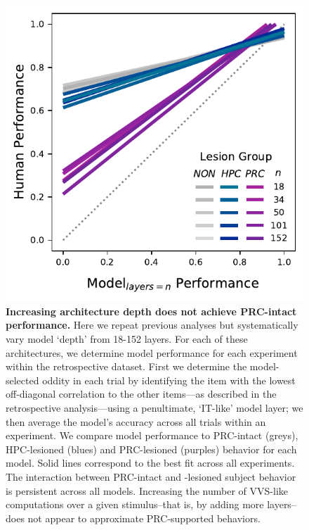 \documentclass[11pt]{article}
\begin{document}
\begin{figure}[ht]
\centering
\includegraphics[width=.7\linewidth]{figures/multiple_resnets}
\caption{\textbf{Increasing architecture depth does not achieve PRC-intact performance.} Here we repeat previous analyses but systematically vary model `depth' from 18-152 layers. For each of these architectures, we determine model performance for each experiment within the retrospective dataset. First we determine the model-selected oddity in each trial by identifying the item with the lowest off-diagonal correlation to the other items---as described in the retrospective analysis---using a penultimate, `IT-like' model layer; we then average the model's accuracy across all trials within an experiment. We compare model performance to PRC-intact (greys), HPC-lesioned (blues) and PRC-lesioned (purples) behavior for each model. Solid lines correspond to the best fit across all experiments. The interaction between PRC-intact and -lesioned subject behavior is persistent across all models. Increasing the number of VVS-like computations over a given stimulus–that is, by adding more layers–does not appear to approximate PRC-supported behaviors.}
\label{fig:layer_analysis}
\end{figure}


\end{document}
